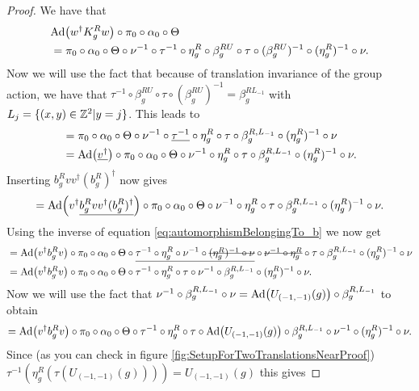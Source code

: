 \documentclass[12pt,a4paper,twoside]{article}
\numberwithin{equation}{section}
\begin{document}
\begin{proof}
	We have that
	\begin{align}
		&\Ad{w^\dagger K_g^R w}\circ\pi_0\circ\alpha_0\circ\Theta\\
		&=\pi_0\circ\alpha_0\circ\Theta\circ\nu^{-1}\circ\tau^{-1}\circ\eta_g^R\circ\beta_g^{RU}\circ\tau\circ(\beta_g^{RU})^{-1}\circ(\eta_g^R)^{-1}\circ\nu.
	\end{align}
	Now we will use the fact that because of translation invariance of the group action, we have that $\tau^{-1}\circ\beta_g^{RU}\circ\tau\circ(\beta_g^{RU})^{-1}=\beta_g^{RL_{-1}}$ with $L_j=\{(x,y)\in\mathbb Z^2|y=j\}$. This leads to
	\begin{align}
		&=\pi_0\circ\alpha_0\circ\Theta\circ\nu^{-1}\circ\underline{\tau^{-1}}\circ\eta_g^R\circ\tau\circ\beta_g^{R,L_{-1}}\circ(\eta_g^R)^{-1}\circ\nu\\
		&=\Ad{\underline{v^\dagger}}\circ \pi_0\circ\alpha_0\circ\Theta\circ\nu^{-1}\circ\eta_g^R\circ\tau\circ\beta_g^{R,L_{-1}}\circ(\eta_g^R)^{-1}\circ\nu.
	\end{align}
	Inserting $b^R_g v v^\dagger (b^R_g)^\dagger$ now gives
	\begin{equation}
		=\Ad{v^\dagger\underline{b^R_g v v^\dagger (b^R_g)^\dagger}}\circ \pi_0\circ\alpha_0\circ\Theta\circ\nu^{-1}\circ\eta_g^R\circ\tau\circ\beta_g^{R,L_{-1}}\circ(\eta_g^R)^{-1}\circ\nu.
	\end{equation}
	 Using the inverse of equation \eqref{eq:automorphismBelongingTo_b} we now get
	\begin{align}
		&=\Ad{v^\dagger b^R_g v }\circ \pi_0\circ\alpha_0\circ\Theta\circ\underline{\tau^{-1}\circ\eta_g^R\circ\nu^{-1}\circ\stkout{(\eta_g^R)^{-1}\circ\nu}}\circ\stkout{\nu^{-1}\circ\eta_g^R}\circ\tau\circ\beta_g^{R,L_{-1}}\circ(\eta_g^R)^{-1}\circ\nu\\
		&=\Ad{v^\dagger b_g^R v}\circ\pi_0\circ\alpha_0\circ\Theta\circ\tau^{-1}\circ\eta_g^R\circ\tau\circ\nu^{-1}\circ\beta_g^{R,L_{-1}}\circ(\eta_g^R)^{-1}\circ\nu.
	\end{align}
	Now we will use the fact that $\nu^{-1}\circ\beta_g^{R,L_{-1}}\circ\nu=\Ad{U_{(-1,-1)}(g)}\circ\beta_g^{R,L_{-1}}$ to obtain
	\begin{equation}
		=\Ad{v^\dagger b_g^R v}\circ\pi_0\circ\alpha_0\circ\Theta\circ\tau^{-1}\circ\eta_g^R\circ\tau\circ\Ad{U_{(-1,-1)}(g)}\circ\beta_g^{R,L_{-1}}\circ\nu^{-1}\circ(\eta_g^R)^{-1}\circ\nu.
	\end{equation}
	Since (as you can check in figure \ref{fig:SetupForTwoTranslationsNearProof}) $\tau^{-1}(\eta_g^R(\tau(U_{(-1,-1)}(g))))=U_{(-1,-1)}(g)$ this gives

\end{proof}
\end{document}
